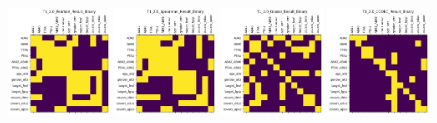 \begin{figure}
    \includegraphics[width=0.24\textwidth]{diss/7_cond/figs/T1_2.0_Pearson_Result_Binary.png}
    \includegraphics[width=0.24\textwidth]{diss/7_cond/figs/T1_2.0_Spearman_Result_Binary.png}
    \includegraphics[width=0.24\textwidth]{diss/7_cond/figs/T1_2.0_Glasso_Result_Binary.png}
    \includegraphics[width=0.24\textwidth]{diss/7_cond/figs/T1_2.0_CODEC_Result_Binary.png}
    

\end{figure}
